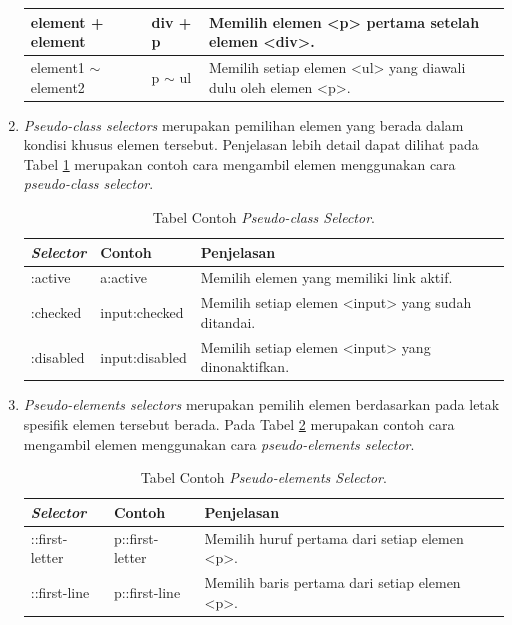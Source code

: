 \begin{enumerate}
\begin{table}[h!]
\begin{tabular}{ | m{9em} | m{2cm}| m{8cm} | }
			\hline
			element + element & div + p & Memilih elemen <p> pertama setelah elemen <div>. \\ 
			\hline
			element1 $\sim$ element2 & p $\sim$ ul & Memilih setiap elemen <ul> yang diawali dulu oleh elemen <p>.  \\ 
			\hline
		\end{tabular}
	\end{table}
	\item \textit{Pseudo-class selectors} merupakan pemilihan elemen yang berada dalam kondisi khusus elemen tersebut. Penjelasan lebih detail dapat dilihat pada Tabel \ref{table:pclass} merupakan contoh cara mengambil elemen menggunakan cara \textit{pseudo-class selector}. 
	\begin{table}[h!] 	\vspace{-0.4cm}
		\centering
		\caption{Tabel Contoh \textit{Pseudo-class Selector}.}
		\label{table:pclass}
		\begin{tabular}{ | m{8em} | m{3cm}| m{8cm} | } 
			\hline
			\textit{\textbf{Selector}}& Contoh & Penjelasan \\ 
			\hline
			:active & a:active & Memilih elemen yang memiliki link aktif. \\ 
			\hline
			:checked & input:checked & Memilih setiap elemen <input> yang sudah ditandai. \\ 
			\hline
			:disabled & input:disabled & Memilih setiap elemen <input> yang dinonaktifkan. \\ 
			\hline
		\end{tabular}
	\end{table}
	\item \textit{Pseudo-elements selectors } merupakan pemilih elemen berdasarkan pada letak spesifik elemen tersebut berada. Pada Tabel \ref{table:pelemen} merupakan contoh cara mengambil elemen menggunakan cara \textit{pseudo-elements selector}.
	\begin{table}[h!] \vspace{-0.4cm}
		\centering
		\caption{Tabel Contoh \textit{Pseudo-elements Selector}.}
		\label{table:pelemen}
		\begin{tabular}{ | m{8em} | m{3cm}| m{8cm} | } 
			\hline
			\textit{\textbf{Selector}}& Contoh & Penjelasan \\ 
			\hline
			::first-letter & p::first-letter & Memilih huruf pertama dari setiap elemen <p>. \\ 
			\hline
			::first-line & p::first-line & Memilih baris pertama dari setiap elemen <p>. \\ 

\end{tabular}
\end{table}
\end{enumerate}
